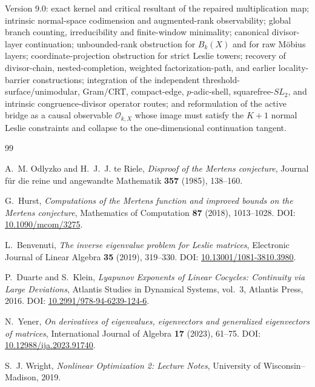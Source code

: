\documentclass[11pt]{amsart}
\numberwithin{equation}{section}
\theoremstyle{plain}
\theoremstyle{definition}
\theoremstyle{remark}
\begin{document}
Version 9.0: exact kernel and critical resultant of the repaired multiplication map; intrinsic normal-space codimension and augmented-rank observability; global branch counting, irreducibility and finite-window minimality; canonical divisor-layer continuation; unbounded-rank obstruction for $B_k(X)$ and for raw M\"obius layers; coordinate-projection obstruction for strict Leslie towers; recovery of divisor-chain, nested-completion, weighted factorization-path, and earlier locality-barrier constructions; integration of the independent threshold-surface/unimodular, Gram/CRT, compact-edge, $p$-adic-shell, squarefree-$SL_2$, and intrinsic congruence-divisor operator routes; and reformulation of the active bridge as a causal observable $\mathcal O_{k,X}$ whose image must satisfy the $K+1$ normal Leslie constraints and collapse to the one-dimensional continuation tangent.

\begin{thebibliography}{99}

A.~M. Odlyzko and H.~J.~J. te Riele,
\emph{Disproof of the Mertens conjecture},
Journal f\"ur die reine und angewandte Mathematik \textbf{357} (1985), 138--160.

G.~Hurst,
\emph{Computations of the Mertens function and improved bounds on the Mertens conjecture},
Mathematics of Computation \textbf{87} (2018), 1013--1028.
DOI: \href{https://doi.org/10.1090/mcom/3275}{10.1090/mcom/3275}.

L.~Benvenuti,
\emph{The inverse eigenvalue problem for Leslie matrices},
Electronic Journal of Linear Algebra \textbf{35} (2019), 319--330.
DOI: \href{https://doi.org/10.13001/1081-3810.3980}{10.13001/1081-3810.3980}.

P.~Duarte and S.~Klein,
\emph{Lyapunov Exponents of Linear Cocycles: Continuity via Large Deviations},
Atlantis Studies in Dynamical Systems, vol.~3, Atlantis Press, 2016.
DOI: \href{https://doi.org/10.2991/978-94-6239-124-6}{10.2991/978-94-6239-124-6}.

N.~Yener,
\emph{On derivatives of eigenvalues, eigenvectors and generalized eigenvectors of matrices},
International Journal of Algebra \textbf{17} (2023), 61--75.
DOI: \href{https://doi.org/10.12988/ija.2023.91740}{10.12988/ija.2023.91740}.

S.~J. Wright,
\emph{Nonlinear Optimization 2: Lecture Notes},
University of Wisconsin--Madison, 2019.

\end{thebibliography}
\end{document}

